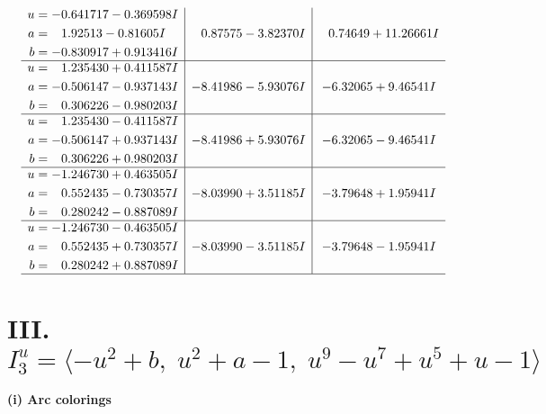 \documentclass[1p]{elsarticle_modified}
\theoremstyle{definition}
\begin{document}
$$\begin{array}{c|c|c}
\begin{aligned}
u &= -0.641717 - 0.369598 I \\
a &= \phantom{-}1.92513 - 0.81605 I \\
b &= -0.830917 + 0.913416 I\end{aligned}
 & \phantom{-}0.87575 - 3.82370 I & \phantom{-}0.74649 + 11.26661 I \\ \hline\begin{aligned}
u &= \phantom{-}1.235430 + 0.411587 I \\
a &= -0.506147 - 0.937143 I \\
b &= \phantom{-}0.306226 - 0.980203 I\end{aligned}
 & -8.41986 - 5.93076 I & -6.32065 + 9.46541 I \\ \hline\begin{aligned}
u &= \phantom{-}1.235430 - 0.411587 I \\
a &= -0.506147 + 0.937143 I \\
b &= \phantom{-}0.306226 + 0.980203 I\end{aligned}
 & -8.41986 + 5.93076 I & -6.32065 - 9.46541 I \\ \hline\begin{aligned}
u &= -1.246730 + 0.463505 I \\
a &= \phantom{-}0.552435 - 0.730357 I \\
b &= \phantom{-}0.280242 - 0.887089 I\end{aligned}
 & -8.03990 + 3.51185 I & -3.79648 + 1.95941 I \\ \hline\begin{aligned}
u &= -1.246730 - 0.463505 I \\
a &= \phantom{-}0.552435 + 0.730357 I \\
b &= \phantom{-}0.280242 + 0.887089 I\end{aligned}
 & -8.03990 - 3.51185 I & -3.79648 - 1.95941 I\\
 \hline 
 \end{array}$$\newpage\newpage\renewcommand{\arraystretch}{1}
\centering \section*{III. $I^u_{3}= \langle - u^2+b,\;u^2+a-1,\;u^9- u^7+u^5+u-1 \rangle$}
\flushleft \textbf{(i) Arc colorings}\\
\end{document}
